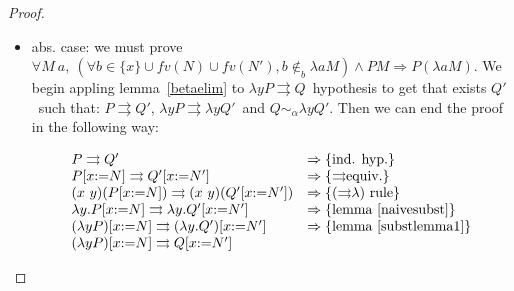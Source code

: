 \documentclass[preprint,10pt]{sigplanconf}
\newcommand{\lam}{\ensuremath{\lambda}}
\newcommand{\alpsym}{\ensuremath{\sim_\alpha}}
\newcommand{\p}{\ensuremath{\rightrightarrows}}
\newcommand{\ninb}{\ensuremath{\not\in_b}}
\begin{document}
\begin{proof}
\begin{itemize}
\begin{itemize}
By the induction hypothesis we also know:

\[ Q [x {:=} N] \p Q' [x {:=} N'] \]

So if we prove that:

\begin{equation}
  \label{eq:eq1}
P'' [x {:=} N'] [y {:=} Q'[x {:=} N']] \alpsym R [x{:=} N']  
\end{equation}


\noindent we will be able to apply the ($\p\beta$) rule and get that $(\lam y (P [x {:=} N])) (Q [x {:=} N]) \p R [x {:=} N']$. Then we can pull out the substitution operation in the left side of this relation, and using the lemma~\ref{pleftalpha} we will get the desired result.

Only remains to prove~(\ref{eq:eq1}) to end the proof. Again, here the classic informal proofs use the BVC convention. We can mimic this common practice as our induction principle gives us a binder $y$\ distinct form $x$ and fresh in $N'$, so we can succesfully apply the substitution composition lemma~\ref{substcomp} in the following steps.
\[
\begin{array}{ll}
  P'' [x {:=} N'] [y {:=} Q'[x {:=} N']] & \alpsym \{\text{lemma~\ref{substcomp}}\}\\
  P'' [y {:=} Q'] [x {:=} N'] & \equiv \{\text{lemma~\ref{substlemma1}}\}\\
  R [x {:=} N']
\end{array}
\]

  \end{itemize}
\item abs. case: we must prove $\forall M\ a,\ (\forall b \in \{x \} \cup fv(N) \cup fv(N'), b \ninb \lam a M) \wedge P M   \Rightarrow P (\lam a M) $. We begin appling lemma~\ref{betaelim} to $\lam y P \p Q$\ hypothesis to get that exists $Q'$\ such that:  $P \p Q'$, $\lam y P \p \lam y Q'$\ and $Q \alpsym \lam y Q'$. Then we can end the proof in the following way:

  \[
    \begin{array}{ll}
      P \p Q'& \Rightarrow \{\text{ind. hyp.} \} \\
      P [x {:=} N] \p Q' [x {:=} N'] & \Rightarrow \{\text{\p equiv.} \} \\
      (x\ y)(P [x {:=} N]) \p (x\ y)(Q' [x {:=} N']) & \Rightarrow \{\text{(\p\lam) rule} \} \\
      \lam y . P [x {:=} N] \p \lam y . Q' [x {:=} N'] & \Rightarrow \{\text{lemma~\ref{naivesubst}} \} \\
      (\lam y P) [x {:=} N] \p (\lam y . Q') [x {:=} N'] & \Rightarrow \{\text{lemma~\ref{substlemma1}} \} \\
      (\lam y P) [x {:=} N] \p Q [x {:=} N'] &
    \end{array}
  \]
  \end{itemize}
\end{proof}
\end{document}
